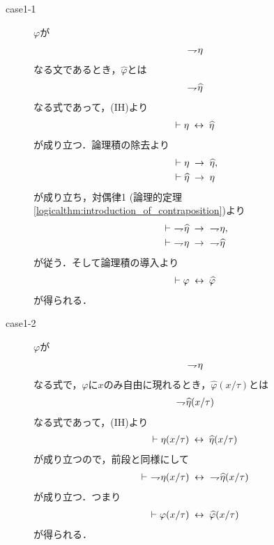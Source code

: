 \begin{sketch}
\begin{description}
			\begin{description}
				\item[case1-1] $\varphi$が
					\begin{align}
						\rightharpoondown\hspace{-0.25em} \eta
					\end{align}
					なる文であるとき，$\widehat{\varphi}$とは
					\begin{align}
						\rightharpoondown\hspace{-0.25em} \widehat{\eta}
					\end{align}
					なる式であって，(IH)より
					\begin{align}
						\vdash \eta \hspace{0.25em}\leftrightarrow\hspace{0.25em} \widehat{\eta}
					\end{align}
					が成り立つ．論理積の除去より
					\begin{align}
						&\vdash \eta \hspace{0.25em}\rightarrow\hspace{0.25em} \widehat{\eta}, \\
						&\vdash \widehat{\eta} \hspace{0.25em}\rightarrow\hspace{0.25em} \eta
					\end{align}
					が成り立ち，対偶律1 (論理的定理\ref{logicalthm:introduction_of_contraposition})より
					\begin{align}
						&\vdash\ \negation \widehat{\eta} \rarrow\ \negation \eta, \\
						&\vdash\ \negation \eta \rarrow\ \negation \widehat{\eta}
					\end{align}
					が従う．そして論理積の導入より
					\begin{align}
						\vdash \varphi \hspace{0.25em}\leftrightarrow\hspace{0.25em} \widehat{\varphi}
					\end{align}
					が得られる．
				
				\item[case1-2] $\varphi$が
					\begin{align}
						\rightharpoondown\hspace{-0.25em} \eta
					\end{align}
					なる式で，$\varphi$に$x$のみ自由に現れるとき，$\widehat{\varphi}(x/\tau)$とは
					\begin{align}
						\rightharpoondown\hspace{-0.25em} \widehat{\eta}(x/\tau)
					\end{align}
					なる式であって，(IH)より
					\begin{align}
						\vdash \eta(x/\tau) \hspace{0.25em}\leftrightarrow\hspace{0.25em} \widehat{\eta}(x/\tau)
					\end{align}
					が成り立つので，前段と同様にして
					\begin{align}
						\vdash\ \negation \eta(x/\tau) \lrarrow\ \negation \widehat{\eta}(x/\tau)
					\end{align}
					が成り立つ．つまり
					\begin{align}
						\vdash \varphi(x/\tau) \hspace{0.25em}\leftrightarrow\hspace{0.25em} \widehat{\varphi}(x/\tau)
					\end{align}
					が得られる．
					

\end{description}
\end{description}
\end{sketch}
